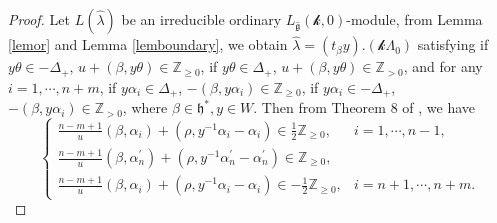 \documentclass[12pt]{article}
\begin{document}
\begin{proof}
Let $L(\hat{\lambda})$ be an irreducible ordinary $L_{\widehat{\mathfrak{g}}}(\mathcal{k},0)$-module,
from Lemma \ref{lemor} and Lemma \ref{lemboundary},
we obtain $\hat{\lambda}=(t_\beta y).(\mathcal{k}\Lambda_0)$
satisfying if $y\theta\in -\Delta_+$, $u+(\beta,y\theta)\in\mathbb{Z}_{\geq0}$,
if $y\theta\in \Delta_+$, $u+(\beta,y\theta)\in\mathbb{Z}_{>0}$,
and for any $i=1,\cdots,n+m$,
if $y\alpha_i\in \Delta_+$, $-(\beta,y\alpha_i)\in\mathbb{Z}_{\geq0}$,
if $y\alpha_i\in -\Delta_+$, $-(\beta,y\alpha_i)\in\mathbb{Z}_{>0}$,
where $\beta\in \mathfrak{h}^*, y\in W$.
Then from Theorem 8 of \cite{Kac77}, we have
$$\begin{cases}
  \frac{n-m+1}{u}(\beta,\alpha_i)+(\rho,y^{-1}\alpha_i-\alpha_i)\in \frac{1}{2}\mathbb{Z}_{\geq0},&i=1,\cdots,n-1,\\
 \frac{n-m+1}{u}(\beta,\alpha_n^\prime)+(\rho,y^{-1}\alpha_n^\prime-\alpha_n^\prime)\in \mathbb{Z}_{\geq0},\\
  \frac{n-m+1}{u}(\beta,\alpha_i)+(\rho,y^{-1}\alpha_i-\alpha_i)\in -\frac{1}{2}\mathbb{Z}_{\geq0},&i=n+1,\cdots,n+m.
\end{cases}$$


\end{proof}
\end{document}
